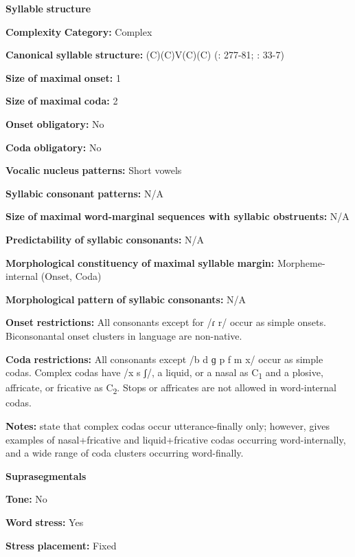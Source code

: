 \begin{styleBody}
\textbf{Syllable} \textbf{structure}

\textbf{Complexity} \textbf{Category:} Complex

\textbf{Canonical} \textbf{syllable} \textbf{structure:} (C)(C)V(C)(C) (\citealt{SaltarelliEtAl1988}: 277-81; \citealt{Hualde2003}: 33-7)

\textbf{Size} \textbf{of} \textbf{maximal} \textbf{onset:} 1

\textbf{Size} \textbf{of} \textbf{maximal} \textbf{coda:} 2

\textbf{Onset} \textbf{obligatory:} No

\textbf{Coda} \textbf{obligatory:} No

\textbf{Vocalic} \textbf{nucleus} \textbf{patterns:} Short vowels

\textbf{Syllabic} \textbf{consonant} \textbf{patterns:} N/A

\textbf{Size} \textbf{of} \textbf{maximal} \textbf{word{}-marginal sequences with syllabic obstruents:} N/A

\textbf{Predictability} \textbf{of} \textbf{syllabic} \textbf{consonants:} N/A

\textbf{Morphological} \textbf{constituency} \textbf{of} \textbf{maximal} \textbf{syllable} \textbf{margin:} Morpheme-internal (Onset, Coda)

\textbf{Morphological} \textbf{pattern} \textbf{of} \textbf{syllabic} \textbf{consonants:} N/A

\textbf{Onset} \textbf{restrictions:} All consonants except for /ɾ r/ occur as simple onsets. Biconsonantal onset clusters in language are non-native.

\textbf{Coda} \textbf{restrictions:} All consonants except /b d ɡ p f m x/ occur as simple codas. Complex codas have /x s ʃ/, a liquid, or a nasal as C\textsubscript{1} and a plosive, affricate, or fricative as C\textsubscript{2}. Stops or affricates are not allowed in word-internal codas.

\textbf{Notes:} \citet{SaltarelliEtAl1988} state that complex codas occur utterance-finally only; however, \citet{Hualde2003} gives examples of nasal+fricative and liquid+fricative codas occurring word-internally, and a wide range of coda clusters occurring word-finally.

\textbf{Suprasegmentals}

\textbf{Tone:} No

\textbf{Word} \textbf{stress:} Yes

\textbf{Stress} \textbf{placement:} Fixed


\end{styleBody}
